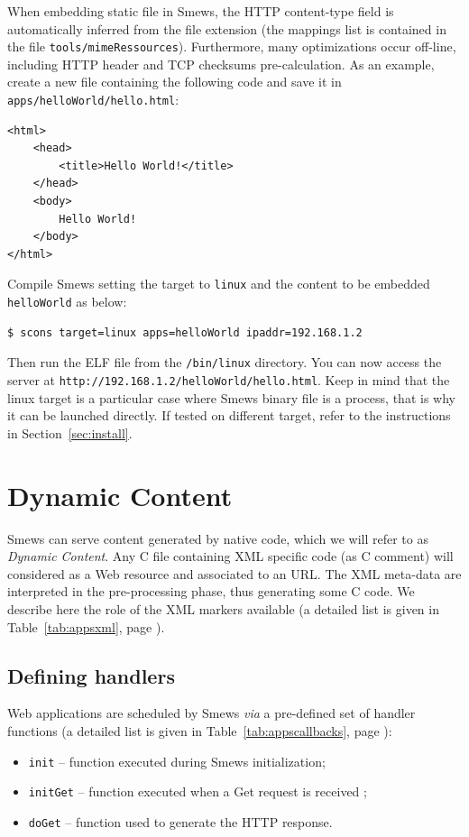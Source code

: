 \documentclass{report}
\newcommand{\rsec}[1]{Section~\ref{sec:#1}}
\newcommand{\rtab}[1]{Table~\ref{tab:#1}}
\begin{document}
When embedding static file in Smews, the HTTP content-type field is automatically inferred from the file extension (the mappings list is contained in the file \texttt{tools/mimeRessources}). Furthermore, many optimizations occur off-line, including HTTP header and TCP checksums pre-calculation. As an example, create a new file containing the following code and save it in \texttt{apps/helloWorld/hello.html}:

\lstset{language=html}
\begin{lstlisting}
<html>
    <head>
        <title>Hello World!</title>
    </head>
    <body>
        Hello World!
    </body>
</html>
\end{lstlisting}

Compile Smews setting the target to \verb+linux+ and the content to be embedded \verb+helloWorld+ as below:
\begin{verbatim}
$ scons target=linux apps=helloWorld ipaddr=192.168.1.2
\end{verbatim}

Then run the ELF file from the \texttt{/bin/linux} directory. You can now access the server at \verb+http://192.168.1.2/helloWorld/hello.html+. Keep in mind that the linux target is a particular case where Smews binary file is a process, that is why it can be launched directly. If tested on different target, refer to the instructions in \rsec{install}.

\section{Dynamic Content}

Smews can serve content generated by native code, which we will refer to as \textit{Dynamic Content}. Any C file containing XML specific code (as C comment) will considered as a Web resource and associated to an URL. The XML meta-data are interpreted in the pre-processing phase, thus generating some C code. We describe here the role of the XML markers available (a detailed list is given in \rtab{appsxml}, page \pageref{tab:appsxml}).

\subsection{Defining handlers}

Web applications are scheduled by Smews {\it via} a pre-defined set of handler functions (a detailed list is given in \rtab{appscallbacks}, page \pageref{tab:appscallbacks}):
\begin{itemize}
\item \verb+init+ -- function executed during Smews initialization;
\item \verb+initGet+ -- function executed when a Get request is received ;
\item \verb+doGet+ -- function used to generate the HTTP response.
\end{itemize}
\end{document}
